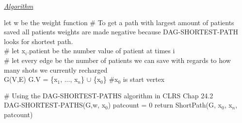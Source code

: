 \documentclass[10pt]{csc_assignment}
\begin{document}
\begin{description}
\emph{\underline{Algorithm}}\\
\begin{algorithm}[H]
 \LinesNumbered 
let w be the weight function\;
\# To get a path with largest amount of patients saved all patients weights are made negative because DAG-SHORTEST-PATH looks for shortest path.\\
\# let x$_{i}$.patient be the number value of patient at times i\\
\# let every edge be the number of patients we can save with regards to how many shots we currently recharged\\
G(V,E)\;
G.V = \{x$_{1}$, ..., x$_{n}$\} $\cup$ \{x$_{0}$\} \#x$_{0}$ is start vertex\;

 \# Using the DAG-SHORTEST-PATHS algorithm in CLRS Chap 24.2 \\
DAG-SHORTEST-PATHS(G,w, x$_{0}$)\;
patcount = 0\;
return ShortPath(G, x$_{0}$, x$_{n}$, patcount)\;
\end{algorithm}


\LinesNumbered
\begin{algorithm}[H]
\end{algorithm}



\end{description}
\end{document}
